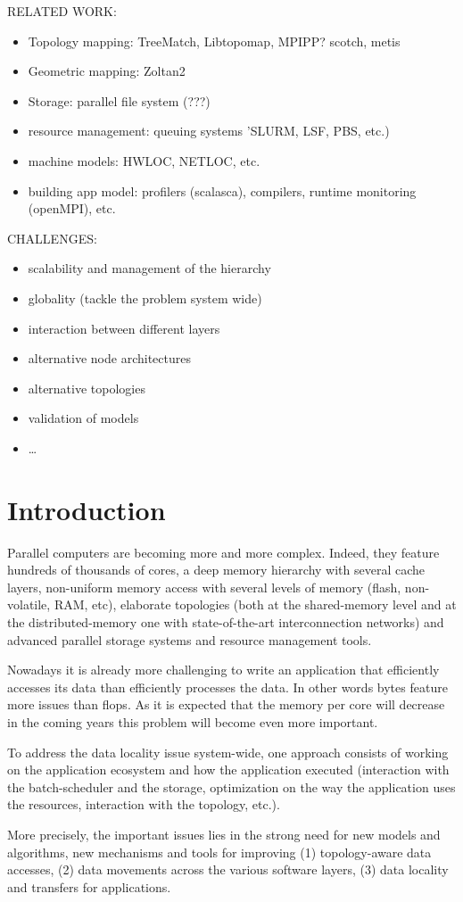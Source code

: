 RELATED WORK: 

\begin{itemize}
\item Topology mapping: TreeMatch, Libtopomap, MPIPP? scotch, metis  
\item Geometric mapping: Zoltan2
\item Storage: parallel file system (???)
\item resource management: queuing systems 'SLURM, LSF, PBS, etc.)
\item machine models: HWLOC, NETLOC, etc. 
\item building app model: profilers (scalasca), compilers, runtime monitoring (openMPI), etc. 
\end{itemize}

CHALLENGES:
\begin{itemize}
\item scalability and management of the hierarchy
\item globality (tackle the problem system wide)
\item interaction between different layers
\item alternative node architectures
\item alternative topologies
\item validation of models
\item \ldots
\end{itemize}


\section{Introduction}
 

Parallel computers are becoming more and more complex. 
Indeed, they feature hundreds of thousands of cores, a deep memory hierarchy with 
several cache layers, non-uniform memory access with  several levels of memory (flash,
non-volatile, RAM, etc), elaborate topologies (both at the
shared-memory level and at the distributed-memory one with state-of-the-art
interconnection networks) and advanced parallel storage systems and resource
management tools.

Nowadays it is already more challenging to write an application that efficiently
accesses its data than efficiently processes the data. In other words bytes 
feature more issues than flops. As it is expected that the memory
per core will decrease in the coming years this problem will become even
more important. 

To address the data locality issue system-wide, one approach consists of
working on the application ecosystem and how the application executed (interaction
with the batch-scheduler and the storage, optimization on the way the
application uses the resources, interaction with the topology, etc.). 

More precisely, the important issues lies in the strong need for new models and algorithms, new 
mechanisms and tools for improving (1) topology-aware data accesses, (2) data 
movements across the various software layers, (3) data locality and transfers for 
applications. 
